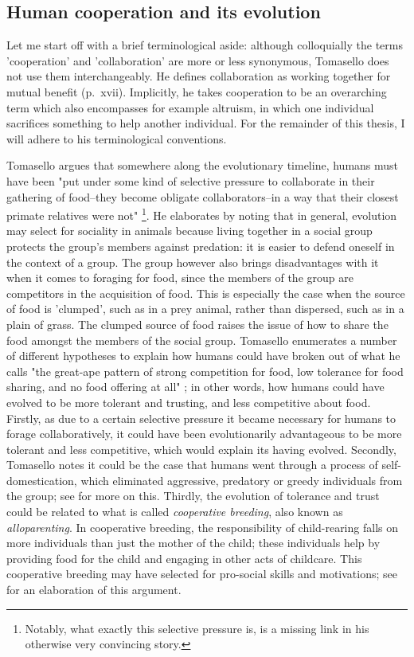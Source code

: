 \subsection{Human cooperation and its evolution}
\label{sec:comm:cooperation}

Let me start off with a brief terminological aside: although colloquially the terms 'cooperation' and 'collaboration' are more or less synonymous, Tomasello does not use them interchangeably. He defines collaboration as working together for mutual benefit (p.~xvii). Implicitly, he takes cooperation to be an overarching term which also encompasses for example altruism, in which one individual sacrifices something to help another individual. For the remainder of this thesis, I will adhere to his terminological conventions.

Tomasello argues that somewhere along the evolutionary timeline, humans must have been "put under some kind of selective pressure to collaborate in their gathering of food--they become obligate collaborators--in a way that their closest primate relatives were not" \citep[p.~75]{Tomasello09}\footnote{Notably, what exactly this selective pressure is, is a missing link in his otherwise very convincing story.}.
He elaborates by noting that in general, evolution may select for sociality in animals because living together in a social group protects the group's members against predation: it is easier to defend oneself in the context of a group. The group however also brings disadvantages with it when it comes to foraging for food, since the members of the group are competitors in the acquisition of food. This is especially the case when the source of food is 'clumped', such as in a prey animal, rather than dispersed, such as in a plain of grass. The clumped source of food raises the issue of how to share the food amongst the members of the social group.
Tomasello enumerates a number of different hypotheses to explain how humans could have broken out of what he calls "the great-ape pattern of strong competition for food, low tolerance for food sharing, and no food offering at all" \citep[p.~83]{Tomasello09}; in other words, how humans could have evolved to be more tolerant and trusting, and less competitive about food.
Firstly, as due to a certain selective pressure it became necessary for humans to forage collaboratively, it could have been evolutionarily advantageous to be more tolerant and less competitive, which would explain its having evolved.
Secondly, Tomasello notes it could be the case that humans went through a process of self-domestication, which eliminated aggressive, predatory or greedy individuals from the group; see \citet{Benitez21} for more on this.
Thirdly, the evolution of tolerance and trust could be related to what is called \emph{cooperative breeding}, also known as \emph{alloparenting}. In cooperative breeding, the responsibility of child-rearing falls on more individuals than just the mother of the child; these individuals help by providing food for the child and engaging in other acts of childcare. This cooperative breeding may have selected for pro-social skills and motivations; see \citet{Hrdy09} for an elaboration of this argument.

